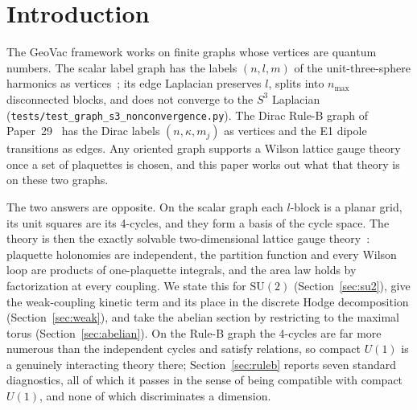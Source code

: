 \documentclass[11pt]{article}
\begin{document}
\section{Introduction}
\label{sec:intro}

The GeoVac framework works on finite graphs whose vertices are quantum
numbers.  The scalar label graph has the labels $(n,l,m)$ of the
unit-three-sphere harmonics as vertices~\cite{paper7}; its edge Laplacian
preserves $l$, splits into $n_{\max}$ disconnected blocks, and does not
converge to the $S^3$ Laplacian (\texttt{tests/test\_graph\_s3\_nonconvergence.py}).
The Dirac Rule-B graph of Paper~29~\cite{paper29} has the Dirac labels
$(n,\kappa,m_j)$ as vertices and the E1 dipole transitions as edges.  Any
oriented graph supports a Wilson lattice gauge
theory~\cite{wilson1974,creutz1983,rothe2012} once a set of plaquettes is
chosen, and this paper works out what that theory is on these two graphs.

The two answers are opposite.  On the scalar graph each $l$-block is a
planar grid, its unit squares are its 4-cycles, and they form a basis of
the cycle space.  The theory is then the exactly solvable two-dimensional
lattice gauge theory~\cite{migdal1975,gross_witten1980,drouffe_zuber1983}:
plaquette holonomies are independent, the partition function and every
Wilson loop are products of one-plaquette integrals, and the area law holds
by factorization at every coupling.  We state this for $\mathrm{SU}(2)$
(Section~\ref{sec:su2}), give the weak-coupling kinetic term and its place
in the discrete Hodge decomposition (Section~\ref{sec:weak}), and take the
abelian section by restricting to the maximal torus
(Section~\ref{sec:abelian}).  On the Rule-B graph the 4-cycles are far more
numerous than the independent cycles and satisfy relations, so compact
$U(1)$ is a genuinely interacting theory there; Section~\ref{sec:ruleb}
reports seven standard diagnostics, all of which it passes in the sense of
being compatible with compact $U(1)$, and none of which discriminates a
dimension.
\end{document}
